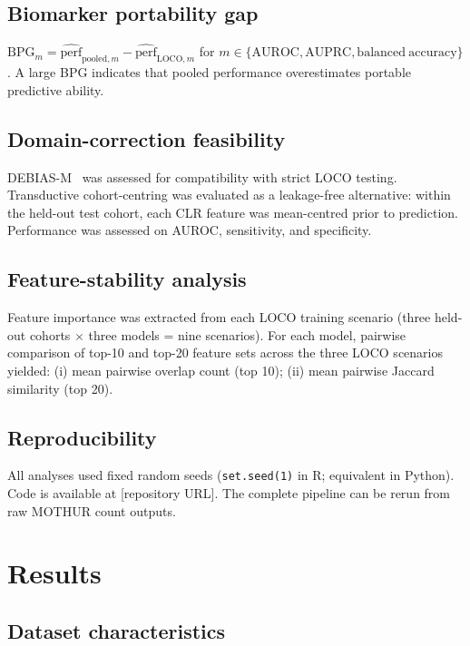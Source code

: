 \documentclass[12pt,a4paper]{article}
\begin{document}
\subsection{Biomarker portability gap}

$\mathrm{BPG}_m = \hat{\mathrm{perf}}_{\mathrm{pooled},m} -
\hat{\mathrm{perf}}_{\mathrm{LOCO},m}$ for $m \in \{\mathrm{AUROC},
\mathrm{AUPRC}, \mathrm{balanced\ accuracy}\}$. A large BPG indicates that
pooled performance overestimates portable predictive ability.

\subsection{Domain-correction feasibility}

DEBIAS-M~\cite{Shi2022} was assessed for compatibility with strict LOCO
testing. Transductive cohort-centring was evaluated as a leakage-free
alternative: within the held-out test cohort, each CLR feature was
mean-centred prior to prediction. Performance was assessed on AUROC,
sensitivity, and specificity.

\subsection{Feature-stability analysis}

Feature importance was extracted from each LOCO training scenario (three
held-out cohorts $\times$ three models = nine scenarios). For each model,
pairwise comparison of top-10 and top-20 feature sets across the three LOCO
scenarios yielded: (i) mean pairwise overlap count (top 10); (ii) mean
pairwise Jaccard similarity (top 20).

\subsection{Reproducibility}

All analyses used fixed random seeds (\texttt{set.seed(1)} in R; equivalent
in Python). Code is available at [repository URL]. The complete pipeline can
be rerun from raw MOTHUR count outputs.

\section{Results}
\label{sec:results}

\subsection{Dataset characteristics}
\end{document}
